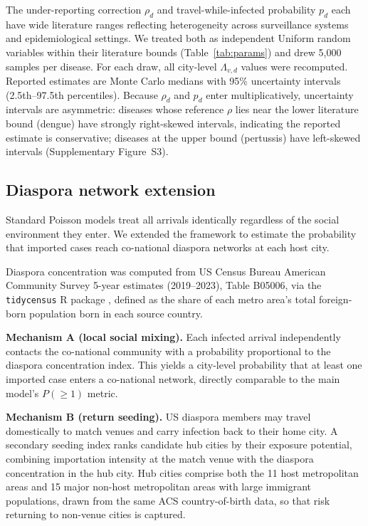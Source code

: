 \documentclass[12pt, a4paper]{article}
\begin{document}
The under-reporting correction $\rho_d$ and travel-while-infected
probability $p_d$ each have wide literature ranges reflecting
heterogeneity across surveillance systems and epidemiological settings.
We treated both as independent Uniform random variables within their
literature bounds (Table~\ref{tab:params}) and drew 5,000 samples per
disease. For each draw, all city-level $\Lambda_{v,d}$ values were
recomputed. Reported estimates are Monte Carlo medians with 95\%
uncertainty intervals (2.5th--97.5th percentiles). Because $\rho_d$
and $p_d$ enter multiplicatively, uncertainty intervals are asymmetric:
diseases whose reference $\rho$ lies near the lower literature bound
(dengue) have strongly right-skewed intervals, indicating the reported
estimate is conservative; diseases at the upper bound (pertussis) have
left-skewed intervals (Supplementary Figure~S3).

\subsection{Diaspora network extension}

Standard Poisson models treat all arrivals identically regardless of
the social environment they enter. We extended the framework to
estimate the probability that imported cases reach co-national
diaspora networks at each host city.

Diaspora concentration was computed from US Census Bureau American
Community Survey 5-year estimates (2019--2023), Table B05006, via the
\texttt{tidycensus} R package \citep{tidycensus,Census2026WC},
defined as the share of each metro area's total foreign-born
population born in each source country.

\textbf{Mechanism A (local social mixing).} Each infected arrival
independently contacts the co-national community with a probability
proportional to the diaspora concentration index. This yields a
city-level probability that at least one imported case enters a
co-national network, directly comparable to the main model's
$P(\geq 1)$ metric.

\textbf{Mechanism B (return seeding).} US diaspora members may
travel domestically to match venues and carry infection back to
their home city. A secondary seeding index ranks candidate hub
cities by their exposure potential, combining importation intensity
at the match venue with the diaspora concentration in the hub city.
Hub cities comprise both the 11 host metropolitan areas and 15 major
non-host metropolitan areas with large immigrant populations, drawn
from the same ACS country-of-birth data, so that risk returning to
non-venue cities is captured.
\end{document}
